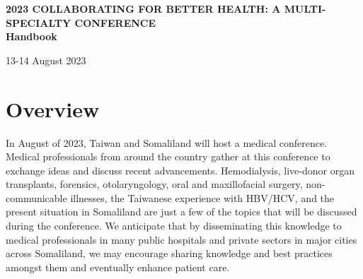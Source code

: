 \documentclass{article}
\begin{document}

\begin{titlepage}

\hspace*{-0.7cm}%
\begin{tikzpicture} %


\hspace{1.4cm}
%

\end{tikzpicture}
    \vspace{4cm}
    
\centering
    {\Huge\bfseries %
    2023 COLLABORATING FOR BETTER HEALTH:
A MULTI-SPECIALTY CONFERENCE\\
    Handbook\par}
    \vspace{1.5cm}
    {\Large 13-14 August 2023\par}


\vspace{2.5cm}




\end{titlepage}



\clearpage

\section*{Overview}
In August of 2023, Taiwan and Somaliland will host a medical conference. Medical professionals from around the country gather at this conference to exchange ideas and discuss recent advancements. Hemodialysis, live-donor organ transplants, forensics, otolaryngology, oral and maxillofacial surgery, non-communicable illnesses, the Taiwanese experience with HBV/HCV, and the present situation in Somaliland are just a few of the topics that will be discussed during the conference. We anticipate that by disseminating this knowledge to medical professionals in many public hospitals and private sectors in major cities across Somaliland, we may encourage sharing knowledge and best practices amongst them and eventually enhance patient care.
\end{document}
